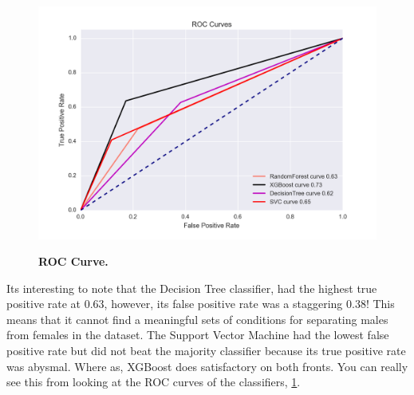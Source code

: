\begin{figure}[!hbtp]
\centering

    \caption{\textbf{ROC Curve. }\textit{}}

    \includegraphics[width=1\textwidth]{figures/rocCurve}
    \label{rocCurve}
\end{figure}
Its interesting to note that the Decision Tree classifier, had the highest true positive rate at 0.63, however, its false positive rate was a staggering 0.38! This means that it cannot find a meaningful sets of conditions for separating males from females in the dataset. The Support Vector Machine had the lowest false positive rate but did not beat the majority classifier because its true positive rate was abysmal. Where as, XGBoost does satisfactory on both fronts. You can really see this from looking at the ROC curves of the classifiers, \ref{rocCurve}.

